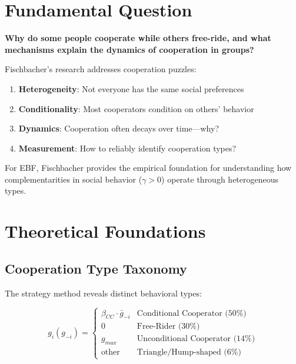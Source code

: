 \section{Fundamental Question}

\begin{tcolorbox}[colback=red!5!white,colframe=red!75!black,title=Central Question]
\textbf{Why do some people cooperate while others free-ride, and what mechanisms explain the dynamics of cooperation in groups?}
\end{tcolorbox}

Fischbacher's research addresses cooperation puzzles:

\begin{enumerate}
    \item \textbf{Heterogeneity}: Not everyone has the same social preferences
    \item \textbf{Conditionality}: Most cooperators condition on others' behavior
    \item \textbf{Dynamics}: Cooperation often decays over time---why?
    \item \textbf{Measurement}: How to reliably identify cooperation types?
\end{enumerate}

For EBF, Fischbacher provides the empirical foundation for understanding how complementarities in social behavior ($\gamma > 0$) operate through heterogeneous types.

\section{Theoretical Foundations}

\subsection{Cooperation Type Taxonomy}

The strategy method reveals distinct behavioral types:

\begin{equation}
g_i(g_{-i}) = \begin{cases}
\beta_{CC} \cdot \bar{g}_{-i} & \text{Conditional Cooperator (50\%)} \\
0 & \text{Free-Rider (30\%)} \\
g_{max} & \text{Unconditional Cooperator (14\%)} \\
\text{other} & \text{Triangle/Hump-shaped (6\%)}
\end{cases}
\end{equation}

